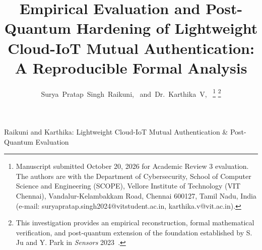 \documentclass[journal,10pt,twocolumn]{IEEEtran}
\begin{document}
\title{Empirical Evaluation and Post-Quantum Hardening of Lightweight Cloud-IoT Mutual Authentication: A Reproducible Formal Analysis}

\author{Surya~Pratap~Singh~Raikuni,~
        and~Dr.~Karthika~V,~%
\thanks{Manuscript submitted October 20, 2026 for Academic Review 3 evaluation. The authors are with the Department of Cybersecurity, School of Computer Science and Engineering (SCOPE), Vellore Institute of Technology (VIT Chennai), Vandalur-Kelambakkam Road, Chennai 600127, Tamil Nadu, India (e-mail: suryapratap.singh2024@vitstudent.ac.in, karthika.v@vit.ac.in).}%
\thanks{This investigation provides an empirical reconstruction, formal mathematical verification, and post-quantum extension of the foundation established by S. Ju and Y. Park in \emph{Sensors} 2023~\cite{jupark2023}.}}

%
{Raikuni and Karthika: Lightweight Cloud-IoT Mutual Authentication \& Post-Quantum Evaluation}

\maketitle
\end{document}
